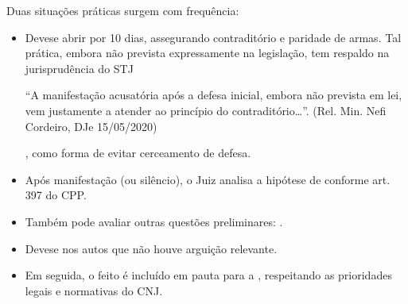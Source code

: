 \documentclass[letterpaper,10pt,brazil]{sphinxmanual}
\begin{document}
\sphinxAtStartPar
Duas situações práticas surgem com frequência:

\sphinxAtStartPar
{}
\begin{itemize}
\item {} 
\sphinxAtStartPar
Deve\sphinxhyphen{}se abrir  por 10 dias, assegurando contraditório e paridade de armas. Tal prática, embora não prevista expressamente na legislação, tem respaldo na jurisprudência do STJ%
\begin{footnote}[5]\sphinxAtStartFootnote
{} \textendash{} “A manifestação acusatória após a defesa inicial, embora não prevista em lei, vem justamente a atender ao princípio do contraditório…”. (Rel. Min. Nefi Cordeiro, DJe 15/05/2020)
%
\end{footnote}, como forma de evitar cerceamento de defesa.

\item {} 
\sphinxAtStartPar
Após manifestação (ou silêncio), o Juiz analisa a hipótese de  conforme art. 397 do CPP.

\item {} 
\sphinxAtStartPar
Também pode avaliar outras questões preliminares: .

\end{itemize}

\sphinxAtStartPar
{}
\begin{itemize}
\item {} 
\sphinxAtStartPar
Deve\sphinxhyphen{}se  nos autos que não houve arguição relevante.

\item {} 
\sphinxAtStartPar
Em seguida, o feito é incluído em pauta para a , respeitando as prioridades legais e normativas do CNJ.

\end{itemize}
\end{document}
